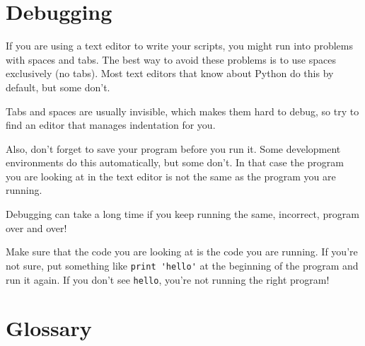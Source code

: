 \documentclass[10pt]{book}
\begin{document}
\section{Debugging}
\label{editor}

If you are using a text editor to write your scripts, you might
run into problems with spaces and tabs.  The best way to avoid
these problems is to use spaces exclusively (no tabs).  Most text
editors that know about Python do this by default, but some
don't.


Tabs and spaces are usually invisible, which makes them
hard to debug, so try to find an editor that manages indentation
for you.

Also, don't forget to save your program before you run it.  Some
development environments do this automatically, but some don't.
In that case the program you are looking at in the text editor
is not the same as the program you are running.

Debugging can take a long time if you keep running the same,
incorrect, program over and over!

Make sure that the code you are looking at is the code you are running.
If you're not sure, put something like \verb"print 'hello'" at the
beginning of the program and run it again.  If you don't see
\verb"hello", you're not running the right program!




\section{Glossary}
\end{document}
